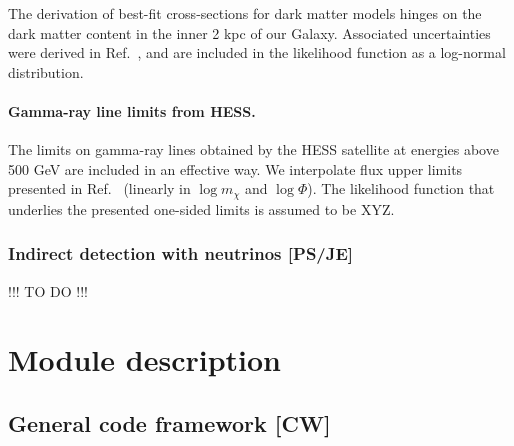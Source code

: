 The derivation of best-fit cross-sections for dark matter models hinges on the
dark matter content in the inner 2 kpc of our Galaxy.  Associated uncertainties
were derived in Ref.~\cite{123}, and are included in the likelihood function as
a log-normal distribution.

\paragraph{Gamma-ray line limits from HESS.}

The limits on gamma-ray lines obtained by the HESS satellite at energies above
500 GeV are included in an effective way.  We interpolate flux upper limits
presented in Ref.~\cite{123} (linearly in $\log m_\chi$ and $\log \Phi$).  The
likelihood function that underlies the presented one-sided limits is assumed to
be XYZ.



\subsubsection{Indirect detection with neutrinos {\bf [PS/JE]}}
\label{phys_nu}
\smallskip
{\color{red} !!! TO DO !!!}
\smallskip





\section{Module description}
\label{code}


\subsection{General code framework {\bf [CW]}}
\label{code_gen}


